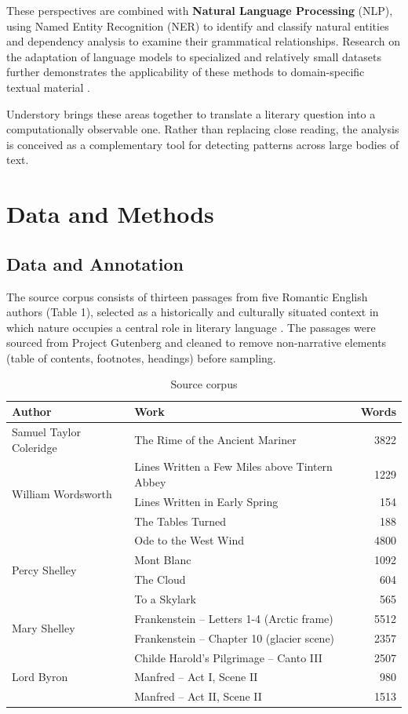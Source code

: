 \documentclass[11pt]{article}
\begin{document}
These perspectives are combined with \textbf{Natural Language Processing} (NLP), using Named Entity Recognition (NER) to identify and classify natural entities and dependency analysis to examine their grammatical relationships. Research on the adaptation of language models to specialized and relatively small datasets further demonstrates the applicability of these methods to domain-specific textual material \cite{dodge:20}.

Understory brings these areas together to translate a literary question into a computationally observable one. Rather than replacing close reading, the analysis is conceived as a complementary tool for detecting patterns across large bodies of text.


\section{Data and Methods}
\subsection{Data and Annotation}
The source corpus consists of thirteen passages from five Romantic English authors (Table 1), selected as a historically and culturally situated context in which nature occupies a central role in literary language \cite{bate:91}. The passages were sourced from Project Gutenberg and cleaned to remove non-narrative elements (table of contents, footnotes, headings) before sampling.

\begin{table}[t]
\centering
\caption{Source corpus}
\label{tab:corpus}
\vspace{4pt}
\begin{tabular}{llr}
\toprule
\textbf{Author} & \textbf{Work} & \textbf{Words} \\
\midrule
Samuel Taylor Coleridge & The Rime of the Ancient Mariner & 3822 \\
\midrule
\multirow{3}{*}{William Wordsworth}
  & Lines Written a Few Miles above Tintern Abbey & 1229 \\
  & Lines Written in Early Spring & 154 \\
  & The Tables Turned & 188 \\
\midrule
\multirow{4}{*}{Percy Shelley}
  & Ode to the West Wind & 4800 \\
  & Mont Blanc & 1092 \\
  & The Cloud & 604 \\
  & To a Skylark & 565 \\
\midrule
\multirow{2}{*}{Mary Shelley}
  & Frankenstein – Letters 1-4 (Arctic frame) & 5512 \\
  & Frankenstein – Chapter 10 (glacier scene) & 2357 \\
\midrule
\multirow{3}{*}{Lord Byron}
  & Childe Harold's Pilgrimage – Canto III & 2507 \\
  & Manfred – Act I, Scene II & 980 \\
  & Manfred – Act II, Scene II & 1513 \\
\bottomrule
\end{tabular}
\end{table}
\end{document}
